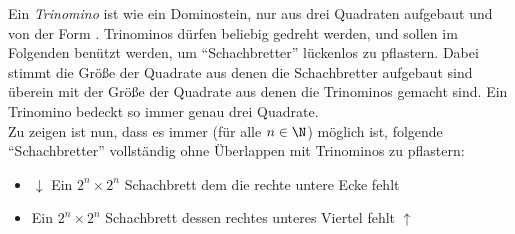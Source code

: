 \begin{exercise}[Trinominos]
  Ein \emph{Trinomino} ist wie ein Dominostein, nur aus drei Quadraten aufgebaut
  und von der Form .
  Trinominos dürfen beliebig gedreht werden, und sollen im Folgenden benützt
  werden, um \enquote{Schachbretter} lückenlos zu pflastern. Dabei stimmt die
  Größe der Quadrate aus denen die Schachbretter aufgebaut sind überein mit der
  Größe der Quadrate aus denen die Trinominos gemacht sind. Ein Trinomino
  bedeckt so immer genau drei Quadrate.\\
  Zu zeigen ist nun, dass es immer (für alle $n \in \N$) möglich ist, folgende
  \enquote{Schachbretter} vollständig ohne Überlappen mit Trinominos zu
  pflastern:
  \begin{itemize}
  \item $\downarrow$ Ein $2^n \times 2^n$ Schachbrett dem die rechte untere
    Ecke fehlt
    \begin{figure}[!h]
      \centering
      \begin{minipage}[b]{0.38\textwidth}
        
      \end{minipage}
      \hspace{1cm}
      \begin{minipage}[b]{0.38\textwidth}
        
      \end{minipage}
    \end{figure}
  \item Ein $2^n \times 2^n$ Schachbrett dessen rechtes unteres Viertel fehlt
    $\uparrow$
  \end{itemize}
\end{exercise}
